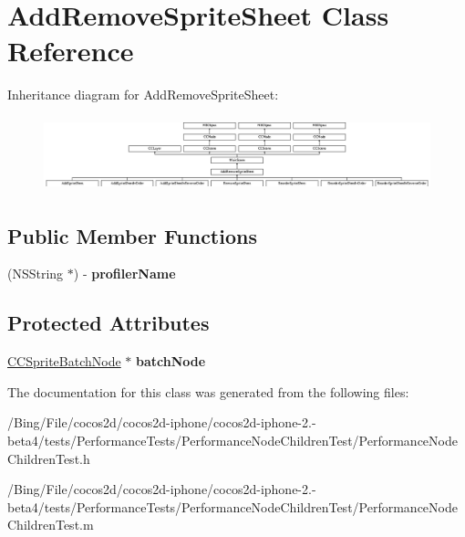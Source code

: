 \hypertarget{interface_add_remove_sprite_sheet}{\section{Add\-Remove\-Sprite\-Sheet Class Reference}
\label{interface_add_remove_sprite_sheet}
}
Inheritance diagram for Add\-Remove\-Sprite\-Sheet\-:\begin{figure}[H]
\begin{center}
\leavevmode
\includegraphics[height=2.162162cm]{interface_add_remove_sprite_sheet}
\end{center}
\end{figure}
\subsection*{Public Member Functions}
\begin{DoxyCompactItemize}
\item 
\hypertarget{interface_add_remove_sprite_sheet_a431ad4b75898058c5903ad63a90460ae}{(N\-S\-String $\ast$) -\/ {\bfseries profiler\-Name}}\label{interface_add_remove_sprite_sheet_a431ad4b75898058c5903ad63a90460ae}

\end{DoxyCompactItemize}
\subsection*{Protected Attributes}
\begin{DoxyCompactItemize}
\item 
\hypertarget{interface_add_remove_sprite_sheet_aad8379de809886bf69e4e716a3d901ae}{\hyperlink{interface_c_c_sprite_batch_node}{C\-C\-Sprite\-Batch\-Node} $\ast$ {\bfseries batch\-Node}}\label{interface_add_remove_sprite_sheet_aad8379de809886bf69e4e716a3d901ae}

\end{DoxyCompactItemize}


The documentation for this class was generated from the following files\-:\begin{DoxyCompactItemize}
\item 
/\-Bing/\-File/cocos2d/cocos2d-\/iphone/cocos2d-\/iphone-\/2.-\/beta4/tests/\-Performance\-Tests/\-Performance\-Node\-Children\-Test/Performance\-Node\-Children\-Test.\-h\item 
/\-Bing/\-File/cocos2d/cocos2d-\/iphone/cocos2d-\/iphone-\/2.-\/beta4/tests/\-Performance\-Tests/\-Performance\-Node\-Children\-Test/Performance\-Node\-Children\-Test.\-m\end{DoxyCompactItemize}
